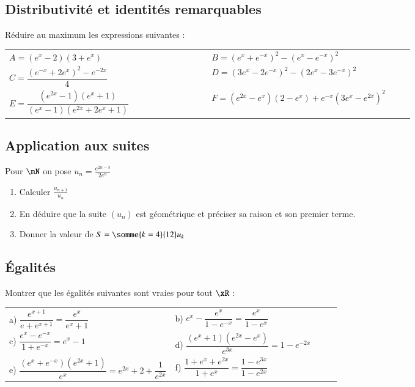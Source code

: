 \documentclass[oneside,12pt]{article}          %
\begin{document}
\subsection{Distributivité et identités remarquables}
Réduire au maximum les expressions suivantes :

\renewcommand{\arraystretch}{2.3}
\begin{tabular}{p{0.45\linewidth} p{0.45\linewidth}}
    $A = \left(e^x-2\right)\left(3+e^x\right)$ & $B = \left(e^x+e^{-x}\right)^2-\left(e^x-e^{-x}\right)^2$\\
    $C = \dfrac{\left(e^{-x}+2e^x\right)^2-e^{-2x}}{4}$\ & $D = \left(3e^x-2e^{-x}\right)^2-\left(2e^x-3e^{-x}\right)^2$\\
    $E = \dfrac{\left(e^{2x}-1\right)\left(e^x+1\right)}{\left(e^x-1\right)\left(e^{2x}+2e^x+1\right)}$ & $F = \left(e^{2x}-e^x\right)\left(2-e^x\right)+e^{-x}\left(3e^x-e^{2x}\right)^2$
\end{tabular}



\subsection{Application aux suites}
Pour $\nN$ on pose $u_n=\frac{e^{2n-3}}{2e^n}$
\begin{enumerate}
    \item Calculer $\frac{u_{n+1}}{u_n}$
    \item En déduire que la suite $(u_n)$ est géométrique et préciser sa raison et son premier terme.
    \item Donner la valeur de $S=\somme{k=4}{12}u_k$
\end{enumerate}



\subsection{Égalités}
Montrer que les égalités suivantes sont vraies pour tout $\xR$ :

\renewcommand{\arraystretch}{2.4}
\begin{tabular}{p{0.5\linewidth} p{0.5\linewidth}}\large
    a) $\dfrac{e^{x+1}}{e+e^{x+1}}=\dfrac{e^x}{e^x+1}$ &
    b) $e^x-\dfrac{e^x}{1-e^{-x}}=\dfrac{e^x}{1-e^x}$ \\
    c) $\dfrac{e^x-e^{-x}}{1+e^{-x}}=e^x-1$ &
    d) $\dfrac{(e^{x}+1)(e^{2x}-e^x)}{e^{3x}}=1-e^{-2x} $\\
    e) $\dfrac{(e^{x}+e^{-x})(e^{2x}+1)}{e^{x}}=e^{2x}+2+\dfrac{1}{e^{2x}}$ &
    f) $\dfrac{1+e^{x}+e^{2x}}{1+e^{x}}=\dfrac{1-e^{3x}}{1-e^{2x}}$
\end{tabular}
\end{document}
